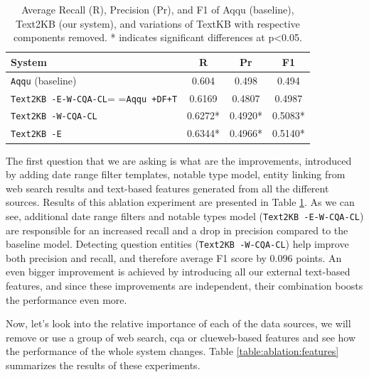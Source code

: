 \begin{table}
\caption{Average Recall (R), Precision (Pr), and F1 of Aqqu (baseline), Text2KB (our system), and variations of TextKB with respective components removed. * indicates significant differences at p<0.05. }
\label{table:ablation:entities_vs_features}
\begin{tabular}{| p{4.2cm} | c | c | c | }
\hline
System & R & Pr & F1 \\
\hline
\texttt{Aqqu} (baseline) & 0.604 & 0.498 & 0.494\\
\texttt{Text2KB -E-W-CQA-CL}= =\texttt{Aqqu +DF+T} & 0.6169 & 0.4807 & 0.4987 \\
\texttt{Text2KB -W-CQA-CL} & 0.6272* & 0.4920* & 0.5083* \\  %
\texttt{Text2KB -E} & 0.6344* & 0.4966* & 0.5140* \\  %
\hline
\end{tabular}
\end{table}

The first question that we are asking is what are the improvements, introduced by adding date range filter templates, notable type model, entity linking from web search results and text-based features generated from all the different sources.
Results of this ablation experiment are presented in Table \ref{table:ablation:entities_vs_features}.
As we can see, additional date range filters and notable types model (\texttt{Text2KB -E-W-CQA-CL}) are responsible for an increased recall and a drop in precision compared to the baseline model.
Detecting question entities (\texttt{Text2KB -W-CQA-CL}) help improve both precision and recall, and therefore average F1 score by 0.096 points.
An even bigger improvement is achieved by introducing all our external text-based features, and since these improvements are independent, their combination boosts the performance even more.

Now, let's look into the relative importance of each of the data sources, we will remove or use a group of web search, cqa or clueweb-based features and see how the performance of the whole system changes.
Table \ref{table:ablation:features} summarizes the results of these experiments.

